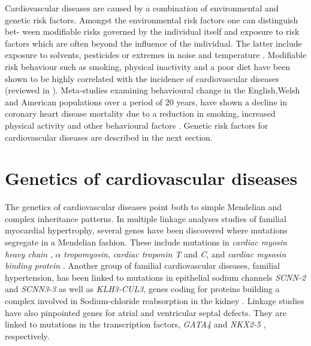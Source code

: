 Cardiovascular diseases are caused by a combination of environmental and genetic risk factors. Amongst the environmental risk factors one can distinguish bet- ween modifiable risks governed by the individual itself and exposure to risk factors which are often beyond the influence of the individual. The latter include exposure to solvents, pesticides or extremes in noise and temperature \citep{Bhatnagar2004,Brook2010,Babisch2014}. Modifiable risk behaviour such as smoking, physical inactivity and a poor diet have been shown to be highly correlated with the incidence of cardiovascular diseases (reviewed in \citep{OToole2008,Cosselman2015}). Meta-studies examining behavioural change in the English,Welsh and American populations over a period of 20 years, have shown a decline in coronary heart disease mortality due to a reduction in smoking, increased physical activity and other behavioural factors \citep{Unal2004,Ford2007}. Genetic risk factors for cardiovascular diseases are described in the next section. 

\section{Genetics of cardiovascular diseases}
The genetics of cardiovascular diseases point both to simple Mendelian and complex inheritance patterns. In multiple linkage analyses studies of familial myocardial hypertrophy, several genes have been discovered where mutations segregate in a Mendelian fashion. These include mutations in \textit{cardiac myosin heavy chain} \citep{Geisterfer-Lowrance1990}, \(\alpha\) \textit{tropomyosin}, \textit{cardiac troponin T} and \textit{C}, \citep{Thierfelder1994, Kimura1997} and \textit{cardiac mysosin binding protein} \citep{Carrier1993,Bonne1995}. Another group of familial cardiovascular diseases, familial hypertension, has been linked to mutations in epithelial sodium channels \textit{SCNN-2} and \textit{SCNN3-3} \citep{Boyden2012,Glover2014} as well as \textit{KLH3-CUL3}, genes coding for proteins building a complex involved in Sodium-chloride reabsorption in the kidney  \citep{Hansson1995}. Linkage studies have also pinpointed genes for atrial and ventricular septal defects. They are linked to mutations in the transcription factors, \textit{ GATA4} \citep{Schott1998} and \textit{NKX2-5} \citep{Garg2003}, respectively. 

